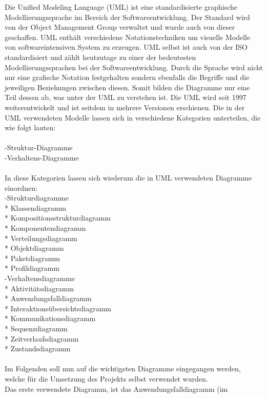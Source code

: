 Die Unified Modeling Language (UML) ist eine standardisierte graphische Modellierungssprache im Bereich der Softwareentwicklung. Der Standard wird von der Object Management Group verwaltet und wurde auch von dieser geschaffen. UML enthält verschiedene Notationstechniken um visuelle Modelle von softwareintensiven System zu erzeugen. UML selbst ist auch von der ISO standardisiert und zählt heutzutage zu einer der bedeutesten Modellierungssprachen bei der Softwareentwicklung. Durch die Sprache wird nicht nur eine grafische Notation festgehalten sondern ebenfalls die Begriffe und die jeweiligen Beziehungen zwischen diesen. Somit bilden die Diagramme nur eine Teil dessen ab, was unter der UML zu verstehen ist.
Die UML wird seit 1997 weiterentwickelt und ist seitdem in mehrere Versionen erschienen.
Die in der UML verwendeten Modelle lassen sich in verschiedene Kategorien unterteilen, die wie folgt lauten:\\
\\
-Struktur-Diagramme\\
-Verhaltens-Diagramme\\
\\
In diese Kategorien lassen sich wiederum die in UML verwendeten Diagramme einordnen:\\
-Strukturdiagramme\\
    * Klassendiagramm\\
    * Kompositionsstrukturdiagramm\\
    * Komponentendiagramm\\
    * Verteilungsdiagramm\\
    * Objektdiagramm\\
    * Paketdiagramm\\
    * Profildiagramm\\
-Verhaltensdiagramme\\
    * Aktivitätsdiagramm\\
    * Anwendungsfalldiagramm\\
    * Interaktionsübersichtsdiagramm\\
    * Kommunikationsdiagramm\\
    * Sequenzdiagramm\\
    * Zeitverlaufsdiagramm\\
    * Zustandsdiagramm\\
\\
Im Folgenden soll nun auf die wichtigsten Diagramme eingegangen werden, welche für die Umsetzung des Projekts selbst verwendet wurden.\\
Das erste verwendete Diagramm, ist das Anwendungsfalldiagramm (im

